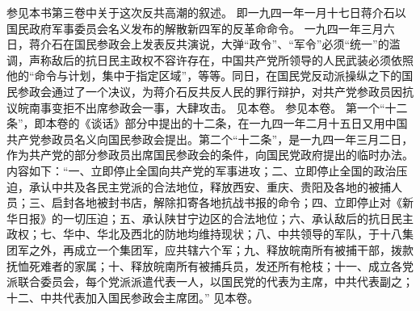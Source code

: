\begin{maonote}
参见本书第三卷中关于这次反共高潮的叙述。
即一九四一年一月十七日蒋介石以国民政府军事委员会名义发布的解散新四军的反革命命令。
一九四一年三月六日，蒋介石在国民参政会上发表反共演说，大弹“政令”、“军令”必须“统一”的滥调，声称敌后的抗日民主政权不容许存在，中国共产党所领导的人民武装必须依照他的“命令与计划，集中于指定区域”，等等。同日，在国民党反动派操纵之下的国民参政会通过了一个决议，为蒋介石反共反人民的罪行辩护，对共产党参政员因抗议皖南事变拒不出席参政会一事，大肆攻击。
见本卷。
参见本卷。
第一个“十二条”，即本卷的《谈话》部分中提出的十二条，在一九四一年二月十五日又用中国共产党参政员名义向国民参政会提出。第二个“十二条”，是一九四一年三月二日，作为共产党的部分参政员出席国民参政会的条件，向国民党政府提出的临时办法。内容如下：“一、立即停止全国向共产党的军事进攻；二、立即停止全国的政治压迫，承认中共及各民主党派的合法地位，释放西安、重庆、贵阳及各地的被捕人员；三、启封各地被封书店，解除扣寄各地抗战书报的命令；四、立即停止对《新华日报》的一切压迫；五、承认陕甘宁边区的合法地位；六、承认敌后的抗日民主政权；七、华中、华北及西北的防地均维持现状；八、中共领导的军队，于十八集团军之外，再成立一个集团军，应共辖六个军；九、释放皖南所有被捕干部，拨款抚恤死难者的家属；十、释放皖南所有被捕兵员，发还所有枪枝；十一、成立各党派联合委员会，每个党派派遣代表一人，以国民党的代表为主席，中共代表副之；十二、中共代表加入国民参政会主席团。”
见本卷。
\end{maonote}
